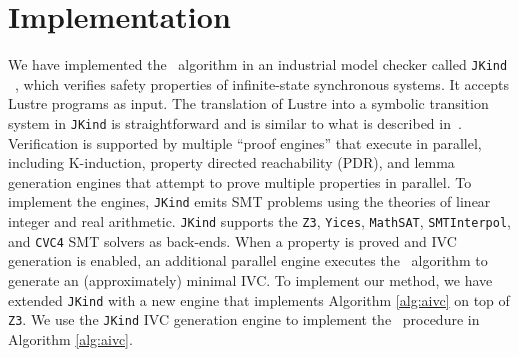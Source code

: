 \section{Implementation}
\label{sec:impl}
We have implemented the \aivcalg ~algorithm
in an industrial model checker called \texttt{JKind} ~\cite{jkind},
which verifies safety properties of  infinite-state synchronous systems.
It accepts Lustre programs \cite{Halbwachs91:lustre} as input.  The translation of Lustre
into a symbolic transition system in \texttt{JKind} is straightforward and is similar to what is described
in~\cite{Hagen08:FMCAD}.
Verification is supported by multiple ``proof engines'' that execute in parallel, including K-induction,
property directed reachability (PDR), and lemma generation engines that attempt to prove
multiple properties in parallel.  To implement the engines,
\texttt{JKind} emits SMT problems using the theories of linear integer and real arithmetic.  \texttt{JKind} supports the
\texttt{Z3}, \texttt{Yices}, \texttt{MathSAT}, \texttt{SMTInterpol}, and \texttt{CVC4} SMT solvers as back-ends.  When a property is
proved and IVC generation is enabled, an additional parallel engine
executes the \ucalg ~algorithm \cite{Ghass16} to generate an (approximately) minimal IVC.
%
To implement our method, we have extended \texttt{JKind} with a new engine that
implements Algorithm \ref{alg:aivc} on top of \texttt{Z3}.
We use the \texttt{JKind} IVC generation engine to implement the \getivc\ procedure in  Algorithm \ref{alg:aivc}.

